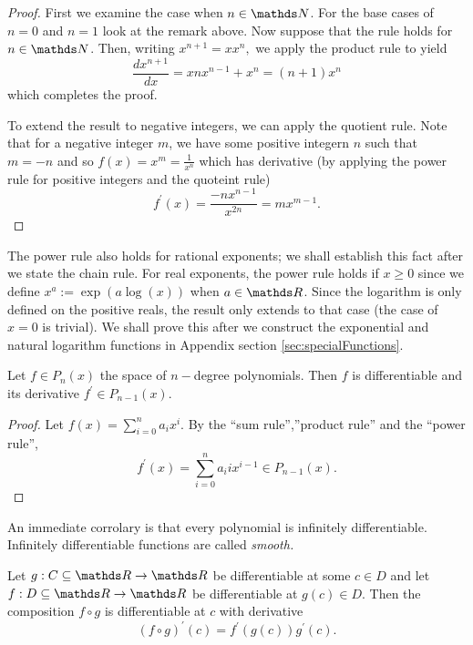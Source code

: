 \begin{proof}
First we examine the case when $n\in\N$. For the base cases of $n=0$
and $n=1$ look at the remark above. Now suppose that the rule holds
for $n\in\N$. Then, writing $x^{n+1}=xx^{n},$ we apply the product
rule to yield
\[
\frac{dx^{n+1}}{dx}=xnx^{n-1}+x^{n}=\left(n+1\right)x^{n}
\]
which completes the proof.

To extend the result to negative integers, we can apply the quotient
rule. Note that for a negative integer $m$, we have some positive
integern $n$ such that $m=-n$ and so $f\left(x\right)=x^{m}=\frac{1}{x^{n}}$
which has derivative (by applying the power rule for positive integers
and the quoteint rule)
\[
f^{\prime}\left(x\right)=\frac{-nx^{n-1}}{x^{2n}}=mx^{m-1}.
\]
\end{proof}
\begin{rem*}
The power rule also holds for rational exponents; we shall establish
this fact after we state the chain rule. For real exponents, the power
rule holds if $x\geq0$ since we define $x^{a}:=\exp\left(a\log\left(x\right)\right)$
when $a\in\R$. Since the logarithm is only defined on the positive
reals, the result only extends to that case (the case of $x=0$ is
trivial). We shall prove this after we construct the exponential and
natural logarithm functions in Appendix section \ref{sec:specialFunctions}.
\end{rem*}
\begin{prop}
\label{prop:differentiabilityOfPolynomials}Let $f\in P_{n}\left(x\right)$
the space of $n-$degree polynomials. Then $f$ is differentiable
and its derivative $f^{\prime}\in P_{n-1}\left(x\right).$
\end{prop}

\begin{proof}
Let $f\left(x\right)=\sum_{i=0}^{n}a_{i}x^{i}.$ By the ``sum rule'',''product
rule'' and the ``power rule'', 
\[
f^{\prime}\left(x\right)=\sum_{i=0}^{n}a_{i}ix^{i-1}\in P_{n-1}\left(x\right).
\]
\end{proof}
\begin{rem*}
An immediate corrolary is that every polynomial is infinitely differentiable.
Infinitely differentiable functions are called \emph{smooth.}
\end{rem*}
\begin{thm}
\label{thm:chainRuleR}Let $g:C\subseteq\R\to\R$ be differentiable
at some $c\in D$ and let $f:D\subseteq\R\to\R$ be differentiable
at $g\left(c\right)\in D.$ Then the composition $f\circ g$ is differentiable
at $c$ with derivative 
\[
\left(f\circ g\right)^{\prime}\left(c\right)=f^{\prime}\left(g\left(c\right)\right)g^{\prime}\left(c\right).
\]
\end{thm}

